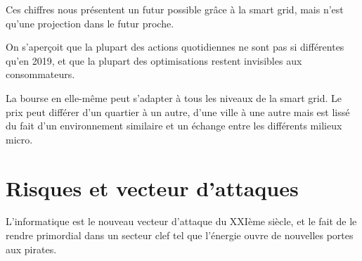 Ces chiffres nous présentent un futur possible grâce à la smart grid, mais n'est qu'une projection dans le futur proche.

On s'aperçoit que la plupart des actions quotidiennes ne sont pas si différentes qu'en 2019, et que la plupart des
optimisations restent invisibles aux consommateurs.

La bourse en elle-même peut s'adapter à tous les niveaux de la smart grid. Le prix peut différer d'un quartier à un autre,
d'une ville à une autre mais est lissé du fait d'un environnement similaire et un échange entre les différents milieux micro.

\section{Risques et vecteur d'attaques}

L'informatique est le nouveau vecteur d'attaque du XXIème siècle, et le fait de le rendre primordial
dans un secteur clef tel que l'énergie ouvre de nouvelles portes aux pirates.
